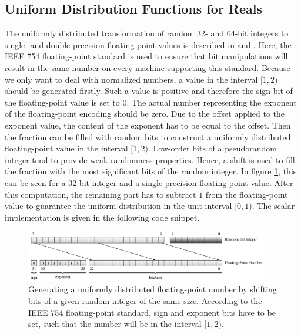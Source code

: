 \documentclass{stdlocal}
\begin{document}
  \subsection{Uniform Distribution Functions for Reals} %
  \label{sub:uniform_real_distribution}
    The uniformly distributed transformation of random 32- and 64-bit integers to single- and double-precision floating-point values is described in \textcite{vigna-xoroshiro} and \textcite{kneusel2018}.
    Here, the IEEE 754 floating-point standard is used to ensure that bit manipulations will result in the same number on every machine supporting this standard.
    Because we only want to deal with normalized numbers, a value in the interval $[1,2)$ should be generated firstly.
    Such a value is positive and therefore the sign bit of the floating-point value is set to $0$.
    The actual number representing the exponent of the floating-point encoding should be zero.
    Due to the offset applied to the exponent value, the content of the exponent has to be equal to the offset.
    Then the fraction can be filled with random bits to construct a uniformly distributed floating-point value in the interval $[1,2)$.
    Low-order bits of a pseudorandom integer tend to provide weak randomness properties.
    Hence, a shift is used to fill the fraction with the most significant bits of the random integer.
    In figure \ref{fig:real-uniform-implementation-scheme}, this can be seen for a 32-bit integer and a single-precision floating-point value.
    After this computation, the remaining part has to subtract $1$ from the floating-point value to guarantee the uniform distribution in the unit interval $[0,1)$.
    The scalar implementation is given in the following code snippet.

    \begin{figure}[h]
      \center
      \includegraphics[width=0.95\textwidth]{figures/uniform_implementation_scheme.pdf}
      \caption[Real Uniform Distribution Function Implementation Scheme]{%
        Generating a uniformly distributed floating-point number by shifting bits of a given random integer of the same size.
        According to the IEEE 754 floating-point standard, sign and exponent bits have to be set, such that the number will be in the interval $[1,2)$.
      }
      \label{fig:real-uniform-implementation-scheme}
    \end{figure}
\end{document}
